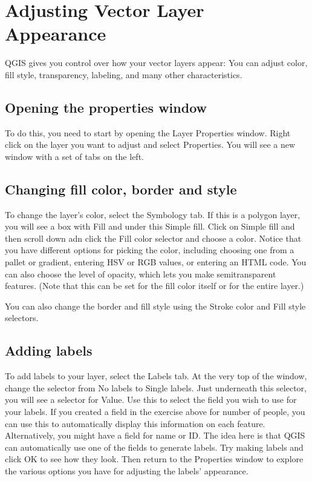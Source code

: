 \documentclass[]{book}
\begin{document}
\hypertarget{vector-appearance}{%
\chapter{Adjusting Vector Layer Appearance}\label{vector-appearance}}

QGIS gives you control over how your vector layers appear: You can adjust color, fill style, transparency, labeling, and many other characteristics.

\hypertarget{opening-the-properties-window}{%
\section{Opening the properties window}\label{opening-the-properties-window}}

To do this, you need to start by opening the Layer Properties window. Right click on the layer you want to adjust and select Properties. You will see a new window with a set of tabs on the left.

\hypertarget{changing-fill-color-border-and-style}{%
\section{Changing fill color, border and style}\label{changing-fill-color-border-and-style}}

To change the layer's color, select the Symbology tab. If this is a polygon layer, you will see a box with Fill and under this Simple fill. Click on Simple fill and then scroll down adn click the Fill color selector and choose a color. Notice that you have different options for picking the color, including choosing one from a pallet or gradient, entering HSV or RGB values, or entering an HTML code. You can also choose the level of opacity, which lets you make semitransparent features. (Note that this can be set for the fill color itself or for the entire layer.)

You can also change the border and fill style using the Stroke color and Fill style selectors.

\hypertarget{adding-labels}{%
\section{Adding labels}\label{adding-labels}}

To add labels to your layer, select the Labels tab. At the very top of the window, change the selector from No labels to Single labels. Just underneath this selector, you will see a selector for Value. Use this to select the field you wish to use for your labels. If you created a field in the exercise above for number of people, you can use this to automatically display this information on each feature. Alternatively, you might have a field for name or ID. The idea here is that QGIS can automatically use one of the fields to generate labels. Try making labels and click OK to see how they look. Then return to the Properties window to explore the various options you have for adjusting the labels' appearance.
\end{document}
